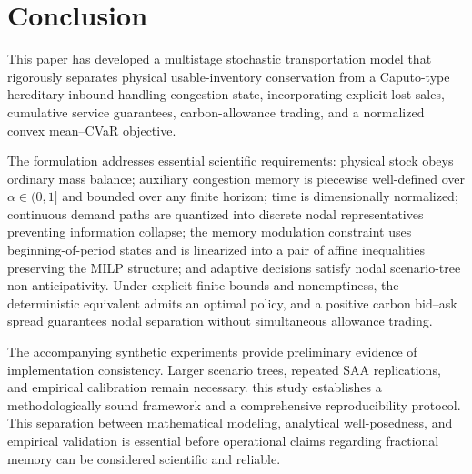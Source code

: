 \documentclass[11pt,a4paper]{article}
\begin{document}
\section{Conclusion}
\label{sec:conclusion}

This paper has developed a multistage stochastic transportation model
that rigorously separates physical usable-inventory conservation from a
Caputo-type hereditary inbound-handling congestion state, incorporating
explicit lost sales, cumulative service guarantees, carbon-allowance
trading, and a normalized convex mean--CVaR objective.

The formulation addresses essential scientific requirements: physical
stock obeys ordinary mass balance; auxiliary congestion memory is
piecewise well-defined over \(\alpha\in(0,1]\) and bounded over any
finite horizon;
time is dimensionally normalized; continuous demand paths are quantized
into discrete nodal representatives preventing information collapse;
the memory modulation constraint uses beginning-of-period states and is
linearized into a pair of affine inequalities preserving the MILP
structure; and adaptive decisions satisfy nodal scenario-tree
non-anticipativity. Under explicit finite bounds and nonemptiness, the
deterministic equivalent admits an optimal policy, and a positive carbon
bid--ask spread guarantees nodal separation without simultaneous
allowance trading.

The accompanying synthetic experiments provide preliminary evidence of implementation consistency. Larger scenario trees, repeated SAA replications, and empirical calibration remain necessary. this study
establishes a methodologically sound framework and a comprehensive
reproducibility protocol. This separation between mathematical modeling,
analytical well-posedness, and empirical validation is essential before
operational claims regarding fractional memory can be considered
scientific and reliable.




\end{document}
